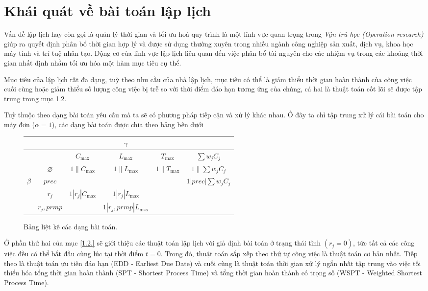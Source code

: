 \section{Khái quát về bài toán lập lịch}
Vấn đề lập lịch hay còn gọi là quản lý thời gian và tối ưu hoá quy trình là một lĩnh vực quan trọng trong \textit{Vận trù học (Operation research)} giúp ra quyết định phân bổ thời gian hợp lý và được sử dụng thường xuyên trong nhiều ngành công nghiệp sản xuất, dịch vụ, khoa học máy tính và trí tuệ nhân tạo. Động cơ của lĩnh vực lập lịch liên quan đến việc phân bổ tài nguyên cho các nhiệm vụ trong các khoảng thời gian nhất định nhằm tối ưu hóa một hàm mục tiêu cụ thể.

Mục tiêu của lập lịch rất đa dạng, tuỳ theo nhu cầu của nhà lập lịch, mục tiêu có thể là giảm thiểu thời gian hoàn thành của công việc cuối cùng hoặc giảm thiểu số lượng công việc bị trễ so với thời điểm đáo hạn tương ứng của chúng, cả hai là thuật toán cốt lõi sẽ được tập trung trong mục 1.2.

Tuỳ thuộc theo dạng bài toán yêu cầu mà ta sẽ có phương pháp tiếp cận và xử lý khác nhau. Ở đây ta chỉ tập trung xử lý cái bài toán cho máy đơn ($\alpha = 1$), các dạng bài toán được chia theo bảng bên dưới
\begin{figure}[h!]
	\centering
	\begin{tabular}{| c || c| c c c c |} 
	\hline
	&&& $\gamma$ && \\
	\hline\hline
	&& $C_{\max}$ & $L_{\max}$ & $T_{\max}$ & $\sum w_j C_j$ \\
	\hline
	& $\varnothing$ & $1\|C_{\max}$ & $1\|L_{\max}$ & $1\|T_{\max}$ & $1\|\sum w_j C_j$ \\
	$\beta$ & $prec$ & \phantom{} & $\phantom{}$&$\phantom{}$ & $1|prec|\sum w_j C_j$ \\
	& $r_j$ & $1|r_j|C_{\max}$ &$1|r_j|L_{\max}$ &$\phantom{}$ &$\phantom{}$ \\
	& $r_j, prmp$ & \phantom{} &$1|r_j, prmp|L_{\max}$&$\phantom{}$&$\phantom{}$ \\
	\hline
	\end{tabular}
	\caption{Bảng liệt kê các dạng bài toán.}
\end{figure}

 Ở phần thứ hai của mục \eqref{1.2.} sẽ giới thiệu các thuật toán lập lịch với giả định bài toán ở trạng thái tĩnh $(r_j = 0)$, tức tất cả các công việc đều có thể bắt đầu cùng lúc tại thời điểm $t = 0$. Trong đó, thuật toán sắp xếp theo thứ tự công việc là thuật toán cơ bản nhất. Tiếp theo là thuật toán ưu tiên đáo hạn (EDD - Earliest Due Date) và cuối cùng là thuật toán thời gian xử lý ngắn nhất tập trung vào việc tối thiểu hóa tổng thời gian hoàn thành (SPT - Shortest Process Time) và tổng thời gian hoàn thành có trọng số (WSPT - Weighted Shortest Process Time).

